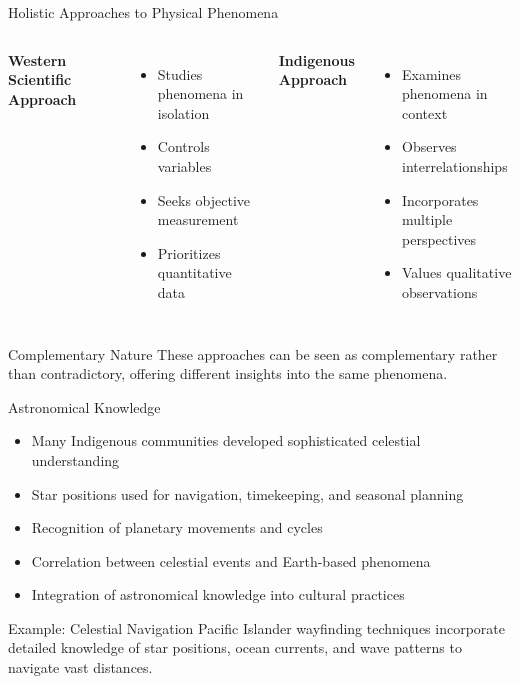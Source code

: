 \documentclass{beamer}
\begin{document}
\begin{frame}{Holistic Approaches to Physical Phenomena}
    \begin{columns}
        \textbf{Western Scientific Approach}
        \begin{itemize}
            \item Studies phenomena in isolation
            \item Controls variables
            \item Seeks objective measurement
            \item Prioritizes quantitative data
        \end{itemize}
        
        \textbf{Indigenous Approach}
        \begin{itemize}
            \item Examines phenomena in context
            \item Observes interrelationships
            \item Incorporates multiple perspectives
            \item Values qualitative observations
        \end{itemize}
    \end{columns}
    
    \begin{block}{Complementary Nature}
        These approaches can be seen as complementary rather than contradictory, offering different insights into the same phenomena.
    \end{block}
\end{frame}

\begin{frame}{Astronomical Knowledge}
    \begin{itemize}
        \item Many Indigenous communities developed sophisticated celestial understanding
        \item Star positions used for navigation, timekeeping, and seasonal planning
        \item Recognition of planetary movements and cycles
        \item Correlation between celestial events and Earth-based phenomena
        \item Integration of astronomical knowledge into cultural practices
    \end{itemize}
    
    \begin{exampleblock}{Example: Celestial Navigation}
        Pacific Islander wayfinding techniques incorporate detailed knowledge of star positions, ocean currents, and wave patterns to navigate vast distances.
    \end{exampleblock}
    
\end{frame}
\end{document}
